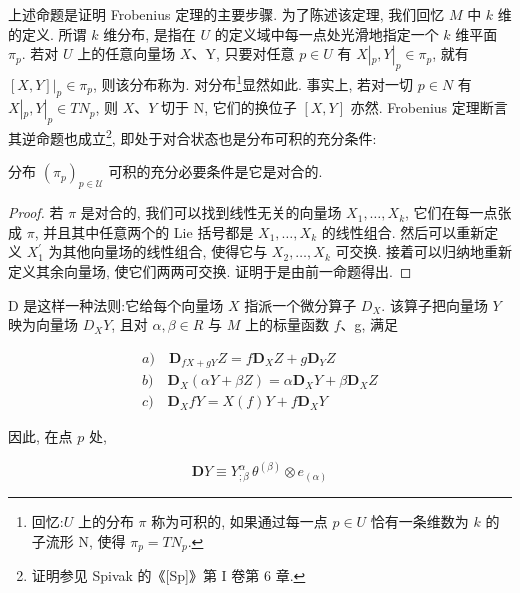 上述命题是证明 Frobenius 定理的主要步骤. 为了陈述该定理, 我们回忆 $M$ 中 $k$ 维的定义. 所谓 $k$ 维分布, 是指在 $U$ 的定义域中每一点处光滑地指定一个 $k$ 维平面 $\pi_{p}$. 若对 $U$ 上的任意向量场 $X$、Y, 只要对任意 $p \in U$ 有 $X|_{p}, Y|_{p} \in \pi_{p}$, 就有 $[X, Y]|_{p} \in \pi_{p}$, 则该分布称为. 对分布\footnote{回忆:$U$ 上的分布 $\pi$ 称为可积的, 如果通过每一点 $p \in U$ 恰有一条维数为 $k$ 的子流形 N, 使得 $\pi_p = TN_p$.}显然如此. 事实上, 若对一切 $p \in N$ 有 $X|_{p}, Y|_{p} \in TN_{p}$, 则 $X$、$Y$ 切于 N, 它们的换位子 $[X, Y]$ 亦然. Frobenius 定理断言其逆命题也成立\footnote{证明参见 Spivak 的《[Sp]》第 I 卷第 6 章.}, 即处于对合状态也是分布可积的充分条件:

\begin{theorem}[Frobenius 定理]\label{thm:cA-2.4}
分布 $(\pi_p)_{p\in\mathcal{U}}$ 可积的充分必要条件是它是对合的.
\end{theorem}

\begin{proof}
若 $\pi$ 是对合的, 我们可以找到线性无关的向量场 $X_{1}, \ldots, X_{k}$, 它们在每一点张成 $\pi$, 并且其中任意两个的 Lie 括号都是 $X_{1}, \ldots, X_{k}$ 的线性组合. 然后可以重新定义 $X_{1}^{\prime}$ 为其他向量场的线性组合, 使得它与 $X_{2}, \ldots, X_{k}$ 可交换. 接着可以归纳地重新定义其余向量场, 使它们两两可交换. 证明于是由前一命题得出.
\end{proof}


 D 是这样一种法则:它给每个向量场 $X$ 指派一个微分算子 $D_{X}$. 该算子把向量场 $Y$ 映为向量场 $D_{X}Y$, 且对 $\alpha, \beta \in R$ 与 $M$ 上的标量函数 $f$、g, 满足

\begin{equation}
\begin{array}{l}
a) \quad \mathbf{D}_{fX + gY}Z = f\mathbf{D}_{X}Z + g\mathbf{D}_{Y}Z \\
b) \quad \mathbf{D}_{X}(\alpha Y + \beta Z) = \alpha\mathbf{D}_{X}Y + \beta\mathbf{D}_{X}Z \\
c) \quad \mathbf{D}_{X}fY = X(f)Y + f\mathbf{D}_{X}Y
\end{array}\label{eq:cA-404}
\end{equation}

因此, 在点 $p$ 处,

\begin{equation}
\mathbf{D}Y \equiv Y^{\alpha}_{;\beta}\, \theta^{(\beta)} \otimes e_{(\alpha)}\label{eq:cA-405}
\end{equation}


